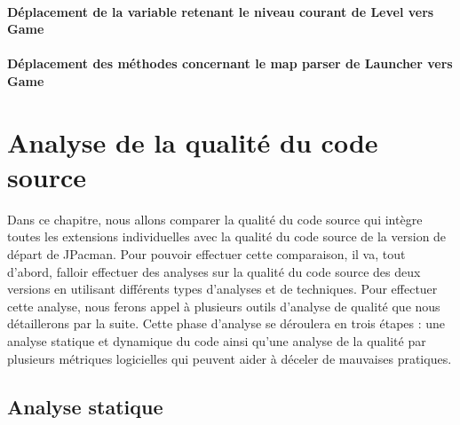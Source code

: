 \documentclass[12pt, openany]{report}
\begin{document}
\subsubsection{Déplacement de la variable retenant le niveau courant de \og Level \fg vers \og Game \fg}
\subsubsection{Déplacement des méthodes concernant le \og map parser \fg de \og Launcher \fg vers \og Game \fg}









\chapter{Analyse de la qualité du code source}

Dans ce chapitre, nous allons comparer la qualité du code source qui intègre toutes les extensions individuelles avec la qualité du code source de la version de départ de JPacman. Pour pouvoir effectuer cette comparaison, il va, tout d'abord, falloir effectuer des analyses sur la qualité du code source des deux versions en utilisant différents types d'analyses et de techniques. Pour effectuer cette analyse, nous ferons appel à plusieurs outils d'analyse de qualité que nous détaillerons par la suite. Cette phase d'analyse se déroulera en trois étapes : une analyse statique et dynamique du code ainsi qu'une analyse de la qualité par plusieurs métriques logicielles qui peuvent aider à déceler de mauvaises pratiques. 

\section{Analyse statique}
\end{document}
